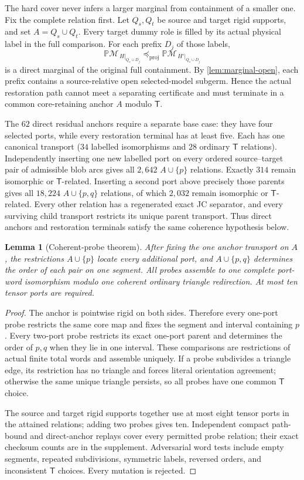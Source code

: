 \documentclass[11pt]{article}
\newtheorem{lemma}[theorem]{Lemma}
\theoremstyle{remark}
\newcommand{\M}{\mathcal M}
\newcommand{\Tmove}{\mathsf T}
\newcommand{\preceqproj}{\preceq_{\!\mathrm{proj}}}
\newcommand{\PM}{\mathbb P\!\M}
\begin{document}
The hard cover never infers a larger marginal from containment of a smaller
one.  Fix the complete relation first.  Let $Q_s,Q_t$ be source and target
rigid supports, and set $A=Q_s\cup Q_t$.  Every target dummy role is filled by
its actual physical label in the full comparison.  For each prefix $D_j$ of
those labels,
\[
\PM_{\,H|_{Q_s\cup D_j}}\preceqproj
\PM_{\,H'|_{Q_s\cup D_j}}
\]
is a direct marginal of the original full containment.  By
\cref{lem:marginal-open}, each prefix contains a source-relative open
selected-model subgerm.  Hence
the actual restoration path cannot meet a separating certificate and must
terminate in a common core-retaining anchor $A$ modulo $\Tmove$.

The $62$ direct residual anchors require a separate base case: they have four
selected ports, while every restoration terminal has at least five.  Each has
one canonical transport ($34$ labelled isomorphisms and $28$ ordinary
$\Tmove$ relations).  Independently inserting one new labelled port on every
ordered source--target pair of admissible blob arcs gives all $2{,}642$
$A\cup\{p\}$ relations.  Exactly $314$ remain isomorphic or
$\Tmove$-related.  Inserting a second port above precisely those parents gives
all $18{,}224$ $A\cup\{p,q\}$ relations, of which $2{,}032$ remain
isomorphic or $\Tmove$-related.  Every other relation has a regenerated exact
JC separator, and every surviving child transport restricts its unique parent
transport.  Thus direct anchors and restoration terminals satisfy the same
coherence hypothesis below.

\begin{lemma}[Coherent-probe theorem]\label{lem:probes}
After fixing the one anchor transport on $A$, the restrictions $A\cup\{p\}$
locate every additional port, and $A\cup\{p,q\}$ determines the order of
each pair on one segment.  All probes assemble to one complete port-word
isomorphism modulo one coherent ordinary triangle redirection.  At most ten
tensor ports are required.
\end{lemma}

\begin{proof}
The anchor is pointwise rigid on both sides.  Therefore every one-port probe
restricts the same core map and fixes the segment and interval containing
$p$.  Every two-port probe restricts its exact one-port parent and determines
the order of $p,q$ when they lie in one interval.  These comparisons are
restrictions of actual finite total words and assemble uniquely.  If a probe
subdivides a triangle edge, its restriction has no triangle and forces
literal orientation agreement; otherwise the same unique triangle persists,
so all probes have one common $\Tmove$ choice.

The source and target rigid supports together use at most eight tensor ports
in the attained relations; adding two probes gives ten.  Independent compact
path-bound and direct-anchor replays cover every permitted probe relation;
their exact checksum counts are in the supplement.  Adversarial word tests
include empty segments, repeated subdivisions, symmetric labels, reversed
orders, and inconsistent $\Tmove$ choices.  Every mutation is rejected.
\end{proof}
\end{document}

